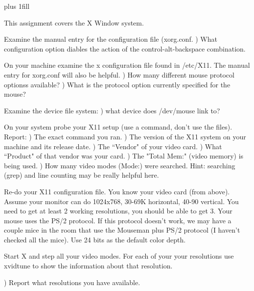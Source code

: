 
\rightskip=0pt plus 1fill

\parindent 0pt

This assignment covers the X Window system.

Examine the manual entry for the configuration file ({\ltt{}xorg.conf}.
\hfill{}) What configuration option diables the action of the control-alt-backspace
combination.

On your machine examine the x configuration file found in {\ltt{}/etc/X11}.
The manual entry for {\ltt{}xorg.conf} will also be helpful.
\hfill{}) How many different mouse protocol optionss available?
\hfill{}) What is the protocol option currently specified for the mouse?

Examine the device file system:
\hfill{}) what device does {\ltt{}/dev/mouse} link to?

On your system probe your X11 setup (use a command, don't use
the files).
Report:
\hfill{}) The exact command you ran.
\hfill{}) The version of the X11 system on your machine and its release date.
\hfill{}) The ``Vendor" of your video card.
\hfill{}) What ``Product" of that vendor was your card.
\hfill{}) The "Total Mem:" (video memory) is being used.
\hfill{}) How many video modes ({\ltt{}Mode:}) were searched.
Hint: searching (grep) and line counting may be really helpful here.

Re-do your X11 configuration file.
You know your video card (from above).
Assume your monitor can do 1024x768, 30-69K horizontal,
40-90 vertical.
You need to get at least 2 working resolutions,
you should be able to get 3.
Your mouse uses the  PS/2 protocol.
If this protocol doesn't work, we may have a couple mice in the
room that use the Mouseman plus PS/2 protocol
(I haven't checked all the mice).
Use 24 bits as the default color depth.

Start X and step all your video modes. For each of your your
resolutions use {\ltt{}xvidtune} to show the information about that
resolution.

\hfill{}) Report what resolutions you have available.

\bye
